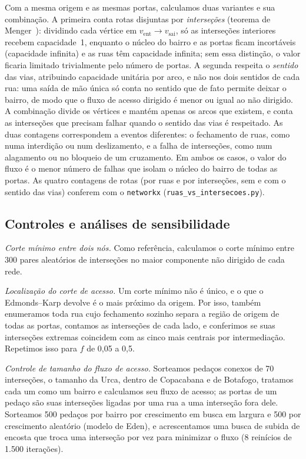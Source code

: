Com a mesma origem e as mesmas portas, calculamos duas variantes e sua
combinação. A primeira conta rotas disjuntas por \emph{interseções}
(teorema de Menger~\cite{menger1927}): dividindo cada vértice em $v_{\text{ent}}\to
v_{\text{sai}}$, só as interseções interiores recebem capacidade~1,
enquanto o núcleo do bairro e as portas ficam incortáveis (capacidade
infinita) e as ruas têm capacidade infinita; sem essa distinção, o valor
ficaria limitado trivialmente pelo número de portas. A segunda respeita o
\emph{sentido} das vias, atribuindo capacidade unitária por arco, e não
nos dois sentidos de cada rua: uma saída de mão única só conta no sentido
que de fato permite deixar o bairro, de modo que o fluxo de acesso
dirigido é menor ou igual ao não dirigido. A combinação divide os
vértices e mantém apenas os arcos que existem, e conta as interseções
que precisam falhar quando o sentido das vias é respeitado.
As duas contagens correspondem a eventos diferentes: o fechamento de
ruas, como numa interdição ou num deslizamento, e a falha de
interseções, como num alagamento ou no bloqueio de um cruzamento. Em
ambos os casos, o valor do fluxo é o menor número de falhas que isolam
o núcleo do bairro de todas as portas. As quatro contagens de rotas (por ruas e por interseções, sem e
com o sentido das vias) conferem com o \texttt{networkx}
(\texttt{ruas\_vs\_intersecoes.py}).

\subsection{Controles e análises de sensibilidade}
\label{sec:controls}

\emph{Corte mínimo entre dois nós.} Como referência, calculamos o corte
mínimo entre 300 pares aleatórios de interseções no maior componente não
dirigido de cada rede.

\emph{Localização do corte de acesso.} Um corte mínimo não é único, e o
que o Edmonds--Karp devolve é o mais próximo da origem. Por isso,
também enumeramos toda rua cujo fechamento sozinho separa a região de
origem de todas as portas, contamos as interseções de cada lado, e
conferimos se suas interseções extremas coincidem com as cinco mais
centrais por intermediação. Repetimos isso para $f$ de 0,05 a 0,5.

\emph{Controle de tamanho do fluxo de acesso.} Sorteamos pedaços conexos
de 70 interseções, o tamanho da Urca, dentro de Copacabana e de Botafogo,
tratamos cada um como um bairro e calculamos seu fluxo de acesso; as
portas de um pedaço são suas interseções ligadas por uma rua a uma
interseção fora dele. Sorteamos 500 pedaços por bairro por crescimento em
busca em largura e 500 por crescimento aleatório (modelo de Eden), e
acrescentamos uma busca de subida de encosta que troca uma interseção por
vez para minimizar o fluxo (8 reinícios de 1.500 iterações).

